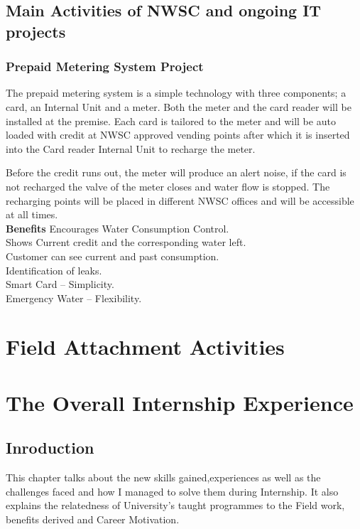 \documentclass{article}
\begin{document}
\subsection{Main Activities of NWSC and ongoing IT projects}
\subsubsection{Prepaid Metering System Project}
The prepaid metering system is a simple technology with three components; a card, an Internal Unit and a meter. Both the meter and the card reader will be installed at the premise. Each card is tailored to the meter and will be auto loaded with credit at NWSC approved vending points after which it is inserted into the Card reader Internal Unit to recharge the meter.
\par Before the credit runs out, the meter will produce an alert noise, if the card is not recharged the valve of the meter closes and water flow is stopped. The recharging points will be placed in different NWSC offices and will be accessible at all times.\\
\textbf{Benefits}
Encourages Water Consumption Control.\\
Shows Current credit and the corresponding water left.\\
Customer can see current and past consumption.\\
Identification of leaks.\\
Smart Card – Simplicity.\\
Emergency Water – Flexibility.

\section{Field Attachment Activities}
\section{The Overall Internship Experience}
\subsection{Inroduction}
This chapter talks about the  new skills gained,experiences as well as the challenges faced and how I managed to solve them during Internship. It also explains the relatedness of University’s taught programmes to the Field work, benefits derived and Career Motivation.
\end{document}

